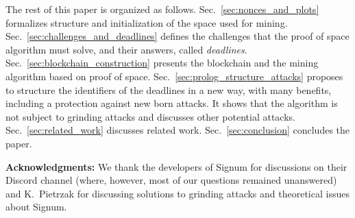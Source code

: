 The rest of this paper is organized as follows.
Sec.~\ref{sec:nonces_and_plots} formalizes structure and initialization of the space used for mining.
Sec.~\ref{sec:challenges_and_deadlines} defines the challenges that the proof of space
algorithm must solve, and their answers, called \emph{deadlines}.
Sec.~\ref{sec:blockchain_construction} presents the blockchain and the mining algorithm
based on proof of space.
Sec.~\ref{sec:prolog_structure_attacks} proposes to structure the identifiers of
the deadlines in a new way, with many benefits, including a protection against new born attacks.
It shows that the algorithm is not subject to grinding attacks and discusses other potential attacks.
Sec.~\ref{sec:related_work} discusses related work.
Sec.~\ref{sec:conclusion} concludes the paper.

\vspace*{1ex}
\textbf{Acknowledgments:}
We thank the developers of Signum for discussions on their Discord channel (where, however, most
of our questions remained unanswered) and K.\ Pietrzak for discussing solutions to
grinding attacks and theoretical issues about Signum.
